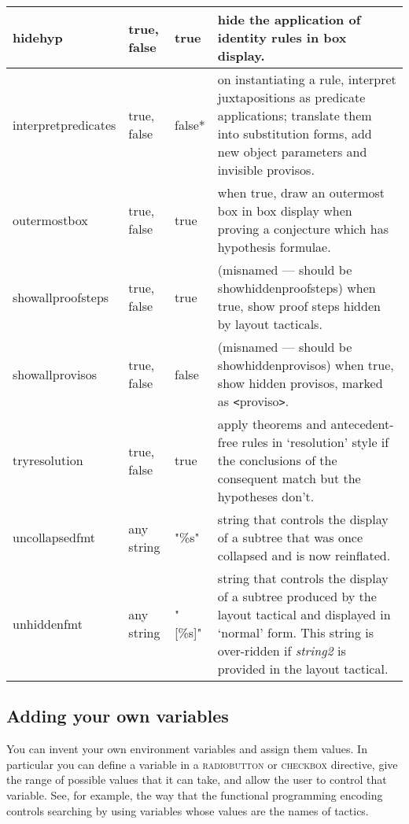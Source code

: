\begin{tabular}{|p{1.034in}|p{0.635in}|p{0.717in}|p{2.114in}|}
\hline
{\raggedright hidehyp} & {\raggedright true, false} & {\raggedright true} & {\raggedright hide the application of identity rules in box display.}\\
\hline
{\raggedright interpretpredicates} & {\raggedright true, false} & {\raggedright false*} & {\raggedright on instantiating a rule, interpret juxtapositions as predicate applications; translate them into substitution forms, add new object parameters and invisible provisos.}\\
\hline
{\raggedright outermostbox} & {\raggedright true, false} & {\raggedright true} & {\raggedright when true, draw an outermost box in box display when proving a conjecture which has hypothesis formulae.}\\
\hline
{\raggedright showallproofsteps} & {\raggedright true, false} & {\raggedright true} & {\raggedright (misnamed --- should be showhiddenproofsteps) when true, show proof steps hidden by layout tacticals.}\\
\hline
{\raggedright showallprovisos} & {\raggedright true, false} & {\raggedright false} & {\raggedright (misnamed --- should be showhiddenprovisos) when true, show hidden provisos, marked as \texttt{<}proviso\texttt{>}.}\\
\hline
{\raggedright tryresolution} & {\raggedright true, false} & {\raggedright true} & {\raggedright apply theorems and antecedent-free rules in `resolution' style if the conclusions of the consequent match but the hypotheses don't.}\\
\hline
{\raggedright uncollapsedfmt} & {\raggedright any string} & {\raggedright "\%s"} & {\raggedright string that controls the display of a subtree that was once collapsed and is now reinflated.}\\
\hline
{\raggedright unhiddenfmt} & {\raggedright any string} & {\raggedright "[\%s]"} & {\raggedright string that controls the display of a subtree produced by the layout tactical and displayed in `normal' form. This string is over-ridden if \textit{string2} is provided in the layout tactical.}\\
\hline \end{tabular}


\subsection{Adding your own variables}


You can invent your own environment variables and assign them values. In particular you can define a variable in a \textsc{radiobutton} or \textsc{checkbox} directive, give the range of possible values that it can take, and allow the user to control that variable. See, for example, the way that the functional programming encoding controls searching by using variables whose values are the names of tactics.


